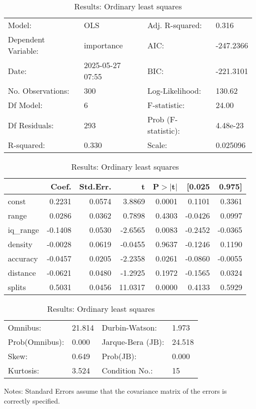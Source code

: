 \begin{table}
\caption{Results: Ordinary least squares}
\label{}
\begin{center}
\begin{tabular}{llll}
\hline
Model:              & OLS              & Adj. R-squared:     & 0.316      \\
Dependent Variable: & importance       & AIC:                & -247.2366  \\
Date:               & 2025-05-27 07:55 & BIC:                & -221.3101  \\
No. Observations:   & 300              & Log-Likelihood:     & 130.62     \\
Df Model:           & 6                & F-statistic:        & 24.00      \\
Df Residuals:       & 293              & Prob (F-statistic): & 4.48e-23   \\
R-squared:          & 0.330            & Scale:              & 0.025096   \\
\hline
\end{tabular}
\end{center}

\begin{center}
\begin{tabular}{lrrrrrr}
\hline
          &   Coef. & Std.Err. &       t & P$> |$t$|$ &  [0.025 &  0.975]  \\
\hline
const     &  0.2231 &   0.0574 &  3.8869 &      0.0001 &  0.1101 &  0.3361  \\
range     &  0.0286 &   0.0362 &  0.7898 &      0.4303 & -0.0426 &  0.0997  \\
iq\_range & -0.1408 &   0.0530 & -2.6565 &      0.0083 & -0.2452 & -0.0365  \\
density   & -0.0028 &   0.0619 & -0.0455 &      0.9637 & -0.1246 &  0.1190  \\
accuracy  & -0.0457 &   0.0205 & -2.2358 &      0.0261 & -0.0860 & -0.0055  \\
distance  & -0.0621 &   0.0480 & -1.2925 &      0.1972 & -0.1565 &  0.0324  \\
splits    &  0.5031 &   0.0456 & 11.0317 &      0.0000 &  0.4133 &  0.5929  \\
\hline
\end{tabular}
\end{center}

\begin{center}
\begin{tabular}{llll}
\hline
Omnibus:       & 21.814 & Durbin-Watson:    & 1.973   \\
Prob(Omnibus): & 0.000  & Jarque-Bera (JB): & 24.518  \\
Skew:          & 0.649  & Prob(JB):         & 0.000   \\
Kurtosis:      & 3.524  & Condition No.:    & 15      \\
\hline
\end{tabular}
\end{center}
\end{table}
\bigskip
Notes: \newline 
[1] Standard Errors assume that the covariance matrix of the errors is correctly specified.